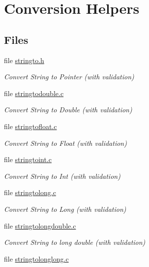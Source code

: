 \hypertarget{group__libmisc__conv__help}{}\section{Conversion Helpers}
\label{group__libmisc__conv__help}
\subsection*{Files}
\begin{DoxyCompactItemize}
\item 
file \mbox{\hyperlink{stringto_8h}{stringto.\+h}}
\begin{DoxyCompactList}\small\item\em Convert String to Pointer (with validation) \end{DoxyCompactList}\item 
file \mbox{\hyperlink{stringtodouble_8c}{stringtodouble.\+c}}
\begin{DoxyCompactList}\small\item\em Convert String to Double (with validation) \end{DoxyCompactList}\item 
file \mbox{\hyperlink{stringtofloat_8c}{stringtofloat.\+c}}
\begin{DoxyCompactList}\small\item\em Convert String to Float (with validation) \end{DoxyCompactList}\item 
file \mbox{\hyperlink{stringtoint_8c}{stringtoint.\+c}}
\begin{DoxyCompactList}\small\item\em Convert String to Int (with validation) \end{DoxyCompactList}\item 
file \mbox{\hyperlink{stringtolong_8c}{stringtolong.\+c}}
\begin{DoxyCompactList}\small\item\em Convert String to Long (with validation) \end{DoxyCompactList}\item 
file \mbox{\hyperlink{stringtolongdouble_8c}{stringtolongdouble.\+c}}
\begin{DoxyCompactList}\small\item\em Convert String to long double (with validation) \end{DoxyCompactList}\item 
file \mbox{\hyperlink{stringtolonglong_8c}{stringtolonglong.\+c}}

\end{DoxyCompactItemize}

